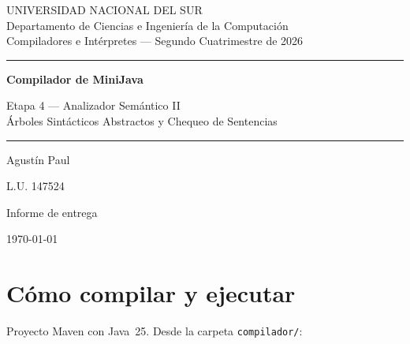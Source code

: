 \documentclass[12pt,a4paper]{article}
\begin{document}
\begin{titlepage}
\thispagestyle{empty}
\raggedright
\vspace*{2.2cm}

{\footnotesize\sffamily
UNIVERSIDAD NACIONAL DEL SUR\\
Departamento de Ciencias e Ingeniería de la Computación\\
Compiladores e Intérpretes --- Segundo Cuatrimestre de 2026\par}

\vspace{2.4cm}
{\rule{\textwidth}{0.6pt}}
\vspace{1.1cm}

{\Huge\bfseries Compilador de MiniJava\par}
\vspace{0.5cm}
{\LARGE\color{tinta} Etapa 4 --- Analizador Semántico II\\[0.25cm]
\large Árboles Sintácticos Abstractos y Chequeo de Sentencias\par}

\vspace{1.1cm}
{\rule{\textwidth}{0.6pt}}

\vspace{2.6cm}
{\large Agustín Paul\par}
\vspace{0.2cm}
{\normalsize L.U. 147524\par}
\vspace{0.4cm}
{Informe de entrega\par}

\vfill
{\color{tinta}\footnotesize \today\par}
\end{titlepage}

\thispagestyle{empty}
\tableofcontents
\newpage
\setcounter{page}{1}
\RaggedRight

\section{Cómo compilar y ejecutar}

Proyecto Maven con Java~25. Desde la carpeta \texttt{compilador/}:
\end{document}
